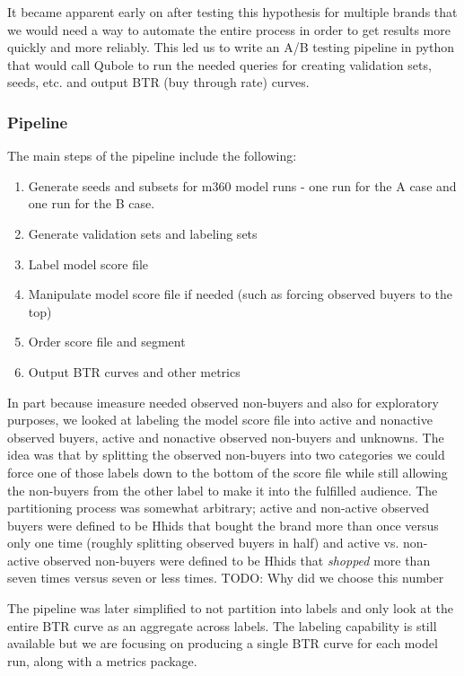 \documentclass[paper=a4, fontsize=11pt]{scrartcl} %
\numberwithin{equation}{section} %
\numberwithin{figure}{section} %
\numberwithin{table}{section} %
\begin{document}
It became apparent early on after testing this hypothesis for multiple brands that we would need a way to automate the entire process in order to get results more quickly and more reliably. This led us to write an A/B testing pipeline in python that would call Qubole to run the needed queries for creating validation sets, seeds, etc. and output BTR (buy through rate) curves.

\subsubsection{Pipeline}

The main steps of the pipeline include the following:


\begin{enumerate}
\item Generate seeds and subsets for m360 model runs - one run for the A case and one run for the B case.
\item Generate validation sets and labeling sets
\item Label model score file
\item Manipulate model score file if needed (such as forcing observed buyers to the top)
\item Order score file and segment
\item Output BTR curves and other metrics
\end{enumerate}

In part because imeasure needed observed non-buyers and also for exploratory purposes, we looked at labeling the model score file into active and nonactive observed buyers, active and nonactive observed non-buyers and unknowns. The idea was that by splitting the observed non-buyers into two categories we could force one of those labels down to the bottom of the score file while still allowing the non-buyers from the other label to make it into the fulfilled audience. The partitioning process was somewhat arbitrary; active and non-active observed buyers were defined to be Hhids that bought the brand more than once versus only one time (roughly splitting observed buyers in half) and active vs. non-active observed non-buyers were defined to be Hhids that \emph{shopped} more than seven times versus seven or less times. TODO: Why did we choose this number

The pipeline was later simplified to not partition into labels and only look at the entire BTR curve as an aggregate across labels. The labeling capability is still available but we are focusing on producing a single BTR curve for each model run, along with a metrics package.
\end{document}
